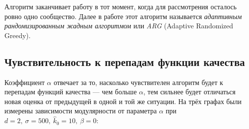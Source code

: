 Алгоритм заканчивает работу в тот момент, когда для рассмотрения осталось ровно одно сообщество. Далее в работе этот алгоритм называется \emph{адаптивным рандомизированным жадным алгоритмом} или \emph{ARG} (Adaptive Randomized Greedy).



\subsection{Чувствительность к перепадам функции качества}

Коэффициент $\alpha$ отвечает за то, насколько чувствителен алгоритм будет к перепадам функций качества --- чем больше $\alpha$, тем сильнее будет отличаться новая оценка от предыдущей в одной и той же ситуации. На трёх графах были измерены зависимости модулярности от параметра $\alpha$ при $d = 2,\ \sigma = 500,\ \hat{k}_0 = 10,\ \beta = 0$:

